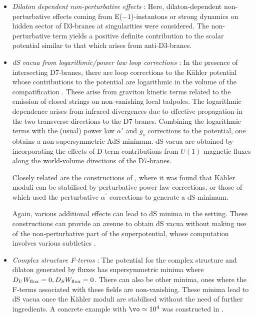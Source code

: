\begin{itemize}
\item {\it Dilaton dependent non-perturbative effects} \cite{Cicoli:2012fh}: Here, dilaton-dependent non-perturbative effects coming from E($-1$)-instantons or strong dynamics on  hidden sector of D3-branes at singularities were considered. The non-perturbative term yields a positive definite contribution to the scalar potential similar to that which arises from anti-D3-branes. 

 \item{\it dS vacua from logarithmic/power law loop corrections \cite{Antoniadis:2018hqy, Antoniadis:2019rkh, Berg:2005yu}}: In the presence of 
 intersecting D7-branes,  there are loop corrections
 to the K\"ahler potential whose  contributions to the potential  are logarithmic in the volume of the compatification \cite{Antoniadis:2018hqy, Antoniadis:2019rkh}.  These arise from graviton kinetic terms related to the emission of closed strings on non-vanishing local tadpoles. The logarithmic dependence arises from infrared divergences due to  effective propagation in the two transverse directions to the D7-branes.  
 Combining  the logarithmic terms with  the (usual) power law $\alpha'$ and $g_{s}$ corrections to the potential, one obtains a non-supersymmetric AdS minimum.  dS vacua are obtained by incorporating the  effects of D-term contributions from $U(1)$ magnetic fluxes along the world-volume directions of the D7-branes.  
 
 Closely related are the constructions of \cite{Berg:2005yu}, where it was found that K\"ahler moduli can be stabilised
 by perturbative power law corrections, or those of  \cite{Balasubramanian:2004uy} which used the perturbative $\alpha^{'}$ corrections to generate a dS minimum.
 
 Again, various additional effects can lead to dS minima in the setting. These constructions can provide an avenue to obtain dS vacua without making use of  the non-perturbative part of the superpotential, whose computation involves  various subtleties \cite{Sethi:2017phn}.  

\item {\it Complex structure F-terms} \cite{Gallego:2017dvd}: The potential for the complex structure and dilaton generated by 
fluxes  has  supersymmetric minima where $D_UW_{\rm flux}=0, D_SW_{\rm flux}=0$. There can also be other minima, ones where the F-terms
associated with these fields are non-vanishing. These minima lead to dS vacua once the K\"ahler moduli are stabilised without the need of further ingredients. A concrete example with $\vo\simeq 10^4$ was constructed in \cite{Gallego:2017dvd}.


\end{itemize}
